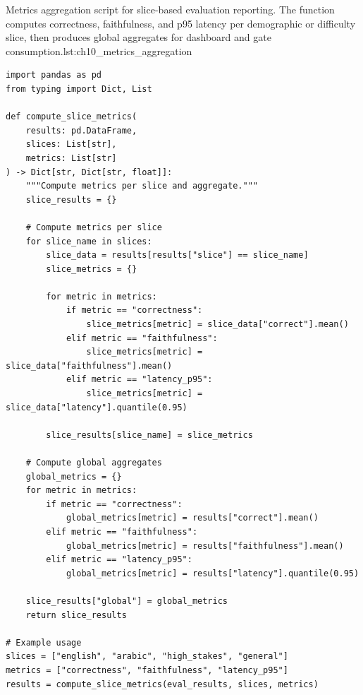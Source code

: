 \begin{codebox}{Metrics aggregation script for slice-based evaluation reporting. The function computes correctness, faithfulness, and p95 latency per demographic or difficulty slice, then produces global aggregates for dashboard and gate consumption.}{lst:ch10_metrics_aggregation}
\begin{verbatim}
import pandas as pd
from typing import Dict, List

def compute_slice_metrics(
    results: pd.DataFrame,
    slices: List[str],
    metrics: List[str]
) -> Dict[str, Dict[str, float]]:
    """Compute metrics per slice and aggregate."""
    slice_results = {}

    # Compute metrics per slice
    for slice_name in slices:
        slice_data = results[results["slice"] == slice_name]
        slice_metrics = {}

        for metric in metrics:
            if metric == "correctness":
                slice_metrics[metric] = slice_data["correct"].mean()
            elif metric == "faithfulness":
                slice_metrics[metric] = slice_data["faithfulness"].mean()
            elif metric == "latency_p95":
                slice_metrics[metric] = slice_data["latency"].quantile(0.95)

        slice_results[slice_name] = slice_metrics

    # Compute global aggregates
    global_metrics = {}
    for metric in metrics:
        if metric == "correctness":
            global_metrics[metric] = results["correct"].mean()
        elif metric == "faithfulness":
            global_metrics[metric] = results["faithfulness"].mean()
        elif metric == "latency_p95":
            global_metrics[metric] = results["latency"].quantile(0.95)

    slice_results["global"] = global_metrics
    return slice_results

# Example usage
slices = ["english", "arabic", "high_stakes", "general"]
metrics = ["correctness", "faithfulness", "latency_p95"]
results = compute_slice_metrics(eval_results, slices, metrics)
\end{verbatim}
\end{codebox}

